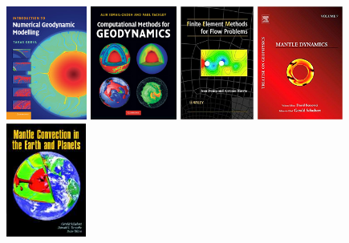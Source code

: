 
\begin{center}
\includegraphics[height=3.74cm]{images/literature/gerya_book}
\includegraphics[height=3.74cm]{images/literature/tackley_book}
\includegraphics[height=3.74cm]{images/literature/donea_huerta_book}
\includegraphics[height=3.74cm]{images/literature/bercovici_book}
\includegraphics[height=3.74cm]{images/literature/sto_book}\\
\end{center}

